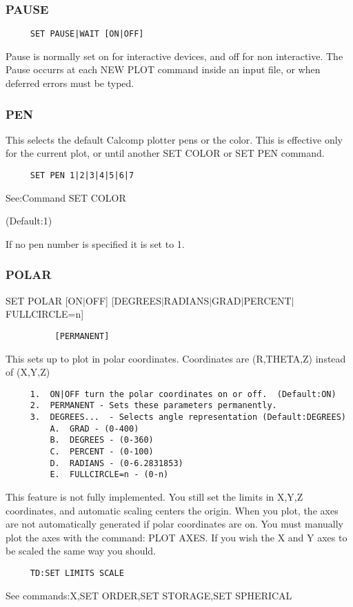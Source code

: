\subsubsection{PAUSE}
\begin{verbatim}
     SET PAUSE|WAIT [ON|OFF] 
\end{verbatim}
Pause  is  normally  set  on  for  interactive devices, and off for non
interactive.  The Pause occurrs at each  NEW  PLOT  command  inside  an
input file, or when deferred errors must be typed.  
\subsubsection{PEN}
This  selects  the  default Calcomp plotter pens or the color.  This is
effective only for the current plot, or until another SET COLOR or  SET
PEN command.  
\begin{verbatim}
     SET PEN 1|2|3|4|5|6|7 
\end{verbatim}

See:Command SET COLOR 

(Default:1) 

If no pen number is specified it is set to 1.  
\subsubsection{POLAR}
SET POLAR [ON$|$OFF] [DEGREES$|$RADIANS$|$GRAD$|$PERCENT$|$FULLCIRCLE=n]
\begin{verbatim}
          [PERMANENT] 
\end{verbatim}

This sets up to plot in polar coordinates.  Coordinates are (R,THETA,Z)
instead of (X,Y,Z) 
\begin{verbatim}
     1.  ON|OFF turn the polar coordinates on or off.  (Default:ON) 
     2.  PERMANENT - Sets these parameters permanently.  
     3.  DEGREES...  - Selects angle representation (Default:DEGREES) 
         A.  GRAD - (0-400) 
         B.  DEGREES - (0-360) 
         C.  PERCENT - (0-100) 
         D.  RADIANS - (0-6.2831853) 
         E.  FULLCIRCLE=n - (0-n) 
\end{verbatim}

This  feature  is  not  fully implemented.  You still set the limits in
X,Y,Z coordinates, and automatic scaling centers the origin.  When  you
plot, the axes are not automatically generated if polar coordinates are
on.  You must manually plot the axes with the command:  PLOT AXES.   If
you wish the X and Y axes to be scaled the same way you should.  
\begin{verbatim}
     TD:SET LIMITS SCALE 
\end{verbatim}
See commands:X,SET ORDER,SET STORAGE,SET SPHERICAL 

